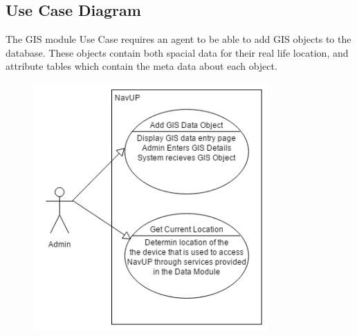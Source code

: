 \subsection{Use Case Diagram}

The GIS module Use Case requires an agent to be able to add GIS objects to the database. These objects contain both spacial data for their real life location, and attribute tables which contain the meta data about each object.

\begin{figure} 
  \includegraphics[width=0.8\textwidth]{GIS/GIS_Use_case.png}
\end{figure}